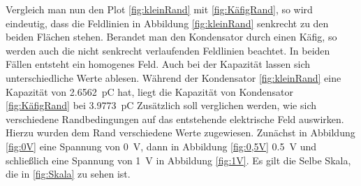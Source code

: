 Vergleich man nun den Plot \ref{fig:kleinRand} mit \ref{fig:KäfigRand}, so wird eindeutig, dass die Feldlinien in Abbildung \ref{fig:kleinRand} senkrecht zu den beiden Flächen stehen. Berandet man den Kondensator durch einen Käfig, so werden auch die nicht senkrecht verlaufenden Feldlinien beachtet. In beiden Fällen entsteht ein homogenes Feld. Auch bei der Kapazität lassen sich unterschiedliche Werte ablesen. Während der Kondensator \ref{fig:kleinRand} eine Kapazität von \SI{2,6562}{\pico\coulomb} hat, liegt die Kapazität von Kondensator \ref{fig:KäfigRand} bei \SI{3,9773}{\pico\coulomb} \newpage
Zusätzlich soll verglichen werden, wie sich verschiedene Randbedingungen auf das entstehende elektrische Feld auswirken. Hierzu wurden dem Rand verschiedene Werte zugewiesen. Zunächst in Abbildung \ref{fig:0V} eine Spannung von \SI{0}{\volt}, dann in Abbildung \ref{fig:0,5V} \SI{0,5}{\volt} und schließlich eine Spannung von \SI{1}{\volt} in Abbildung \ref{fig:1V}. Es gilt die Selbe Skala, die in \ref{fig:Skala} zu sehen ist.

